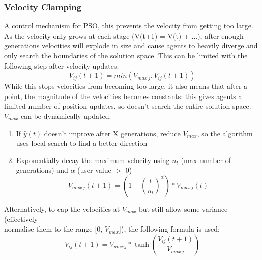 \subsubsection{Velocity Clamping}
A control mechanism for PSO, this prevents the velocity from getting too large. As the velocity only grows at each stage (V(t+1) = V(t) + ...), after enough generations velocities will explode in size and cause agents to heavily diverge and only search the boundaries of the solution space. This can be limited with the following step after velocity updates:
\begin{equation}
    V_{ij}(t+1) = min(V_{max\,j}, V_{ij}(t+1))
\end{equation}
While this stops velocities from becoming too large, it also means that after a point, the magnitude of the velocities becomes constants: this gives agents a limited number of position updates, so doesn't search the entire solution space. $V_{max}$ can be dynamically updated:
\begin{enumerate}
    \item If $\hat{y}(t)$ doesn't improve after X generations, reduce $V_{max}$, so the algorithm uses local search to find a better direction
    \item Exponentially decay the maximum velocity using $n_t$ (max number of generations) and $\alpha$ (user value $>$ 0)
    \begin{equation}
        V_{max\,j}(t+1) = \left( 1 - \left(\frac{t}{n_t}\right)^\alpha \right) * V_{max\,j}(t) \nonumber
    \end{equation}
\end{enumerate}
Alternatively, to cap the velocities at $V_{max}$ but still allow some variance (effectively \\ normalise them to the range [0, $V_{max}$]), the following formula is used:
\begin{equation}
    V_{ij}(t+1) = V_{max\,j} * \tanh{\left( \frac{V_{ij}(t+1)}{V_{max\,j}} \right)} \nonumber
\end{equation}

